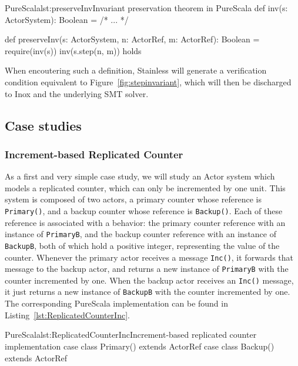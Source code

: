 \documentclass[a4paper,twoside]{article}
\newcommand{\TODO}[1]{\textcolor{YellowOrange}{(TODO: #1)}} %
\newcommand{\RefFig}[1]{Figure~\ref{#1}}
\newcommand{\RefCode}[1]{Listing~\ref{#1}}
\newcommand{\stt}[1]{\texttt{\small{#1}}}
\begin{document}
\begin{enumerate}
\begin{Code}{PureScala}{lst:preserveInv}{Invariant preservation theorem in PureScala}
def inv(s: ActorSystem): Boolean = {
  /* ... */
}

def preserveInv(s: ActorSystem, n: ActorRef, m: ActorRef): Boolean = {
  require(inv(s))
  inv(s.step(n, m))
} holds
\end{Code}

When encoutering such a definition, Stainless will generate a verification condition 
equivalent to \RefFig{fig:stepinvariant}, which will then be discharged to Inox and the underlying SMT solver.

%

\subsection{Case studies}
\label{casestudies}

\subsubsection{Increment-based Replicated Counter}
\label{repcounterinc}

As a first and very simple case study, we will study an Actor system which models a
replicated counter, which can only be incremented by one unit. This system is 
composed of two actors, a primary counter whose reference is \stt{Primary()},
and a backup counter whose reference is \stt{Backup()}.
Each of these reference is associated with a behavior: the primary counter reference with
an instance of \stt{PrimaryB}, and the backup counter reference with an instance 
of \stt{BackupB}, both of which hold a positive integer, representing the value of the
counter. Whenever the primary actor receives a message \stt{Inc()}, it forwards that
message to the backup actor, and returns a new instance of \stt{PrimaryB} with the
counter incremented by one. When the backup actor receives an \stt{Inc()} message,
it just returns a new instance of \stt{BackupB} with the counter incremented by one. 
The corresponding PureScala implementation can be found
in \RefCode{lst:ReplicatedCounterInc}.

\begin{Code}{PureScala}{lst:ReplicatedCounterInc}{Increment-based replicated counter implementation}
case class Primary() extends ActorRef
case class Backup()  extends ActorRef


\end{Code}
\end{enumerate}
\end{document}
